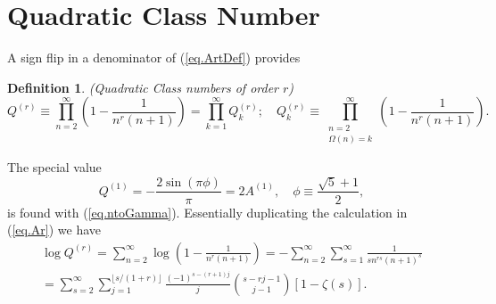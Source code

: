 \documentclass{amsart}
\newtheorem{defn}{Definition}
\begin{document}
\section{Quadratic Class Number}
A sign flip in a denominator of (\ref{eq.ArtDef}) provides
\begin{defn}
(Quadratic Class numbers of order $r$)
\begin{equation}
Q^{(r)}\equiv \prod_{n=2}^\infty \left(1-\frac{1}{n^r(n+1)} \right)
=\prod_{k=1}^\infty Q_k^{(r)};\quad 
Q_k^{(r)}\equiv \prod_{\substack{n=2\\ \Omega(n)=k}}^\infty 
\left(1-\frac{1}{n^r(n+1)} \right)
.
\label{eq.Qdef}
\end{equation}
\end{defn}
The special value
\begin{equation}
Q^{(1)}= -\frac{2\sin(\pi \phi)}{\pi}
= 2A^{(1)}
,\quad \phi\equiv \frac{\sqrt{5}+1}{2},
\end{equation}
is found with (\ref{eq.ntoGamma}).
Essentially duplicating the calculation in (\ref{eq.Ar}) we have
\begin{gather}
\log Q^{(r)}
=
\sum_{n=2}^\infty \log \left(1-\frac{1}{n^r(n+1)}\right)
=
- \sum_{n=2}^\infty \sum_{s=1}^\infty \frac{1}{s n^{rs}(n+1)^s}
\label{eq.Qr}
\\
=
\sum_{s=2}^\infty \sum_{j=1}^{\lfloor s/(1+r)\rfloor} \frac{(-1)^{s-(r+1)j}}{j}\binom{s-rj-1}{j-1}[1-\zeta(s)]
.
\nonumber
\end{gather}
\end{document}

